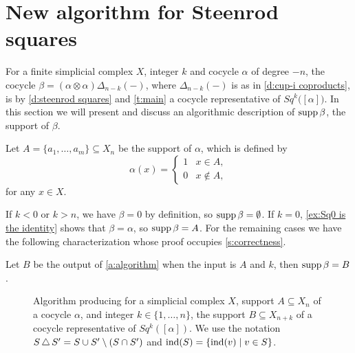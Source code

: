 
\section{New algorithm for Steenrod squares} \label{s:algorithm}

For a finite simplicial complex $X$, integer $k$ and cocycle $\alpha$ of degree $-n$, the cocycle $\beta = (\alpha \otimes \alpha)\Delta_{n-k}(-)$, where $\Delta_{n-k}(-)$ is as in \cref{d:cup-i coproducts}, is by
\cref{d:steenrod squares} and \cref{t:main} a cocycle representative of $Sq^k \big( [\alpha] \big)$.
In this section we will present and discuss an algorithmic description of $\operatorname{supp} \beta$, the support of $\beta$.

Let $A = \{a_1, \dots, a_m\} \subseteq X_n$ be the support of $\alpha$, which is defined by
\[
\alpha(x) = \begin{cases}
1 & x \in A, \\ 0 & x \not\in A,
\end{cases}
\]
for any $x \in X$.

If $k < 0$ or $k > n$, we have $\beta = 0$ by definition,
so $\operatorname{supp} \beta = \emptyset$.
If $k = 0$, \cref{ex:Sq0 is the identity} shows that $\beta = \alpha$, so $\operatorname{supp} \beta = A$.
For the remaining cases we have the following characterization whose proof occupies \cref{s:correctness}.

\begin{theorem} \label{t:algorithm}
	Let $B$ be the output of \cref{a:algorithm} when the input is $A$ and $k$, then $\operatorname{supp} \beta = B$.
\end{theorem}

\begin{figure}
	
	\caption{Algorithm producing for a simplicial complex $X$, support $A \subseteq X_n$ of a cocycle $\alpha$, and integer $k \in \{1, \dots, n\}$, the support $B \subseteq X_{n+k}$ of a cocycle representative of $Sq^k([\alpha])$.
	We use the notation $S \operatorname{\triangle} S^\prime = S \cup S^\prime \setminus (S \cap S^\prime)$ and $\mathrm{ind}(S) = \{\mathrm{ind}(v) \mid v \in S\}$.}
	\label{f:algorithm}
\end{figure}


